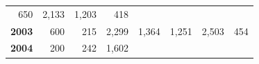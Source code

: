 \documentclass[]{article}
\begin{document}
\begin{longtable}[]{@{}rrrrrrrr@{}}
\begin{minipage}[t]{0.14\columnwidth}
650\strut
\end{minipage} & \begin{minipage}[t]{0.09\columnwidth}\raggedleft\strut
2,133\strut
\end{minipage} & \begin{minipage}[t]{0.08\columnwidth}\raggedleft\strut
1,203\strut
\end{minipage} & \begin{minipage}[t]{0.10\columnwidth}\raggedleft\strut
418\strut
\end{minipage}\tabularnewline
\begin{minipage}[t]{0.08\columnwidth}\raggedleft\strut
\textbf{2003}\strut
\end{minipage} & \begin{minipage}[t]{0.10\columnwidth}\raggedleft\strut
600\strut
\end{minipage} & \begin{minipage}[t]{0.11\columnwidth}\raggedleft\strut
215\strut
\end{minipage} & \begin{minipage}[t]{0.08\columnwidth}\raggedleft\strut
2,299\strut
\end{minipage} & \begin{minipage}[t]{0.14\columnwidth}\raggedleft\strut
1,364\strut
\end{minipage} & \begin{minipage}[t]{0.09\columnwidth}\raggedleft\strut
1,251\strut
\end{minipage} & \begin{minipage}[t]{0.08\columnwidth}\raggedleft\strut
2,503\strut
\end{minipage} & \begin{minipage}[t]{0.10\columnwidth}\raggedleft\strut
454\strut
\end{minipage}\tabularnewline
\begin{minipage}[t]{0.08\columnwidth}\raggedleft\strut
\textbf{2004}\strut
\end{minipage} & \begin{minipage}[t]{0.10\columnwidth}\raggedleft\strut
200\strut
\end{minipage} & \begin{minipage}[t]{0.11\columnwidth}\raggedleft\strut
242\strut
\end{minipage} & \begin{minipage}[t]{0.08\columnwidth}\raggedleft\strut
1,602\strut
\end{minipage} & \begin{minipage}[t]{0.14\columnwidth}\raggedleft\strut

\end{minipage}
\end{longtable}
\end{document}
